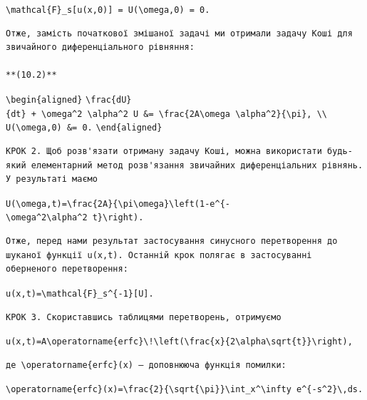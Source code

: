 \documentclass[
  ukrainian,
]{article}
\begin{document}
\texttt{\textbackslash{}mathcal\{F\}\_s{[}u(x,0){]}\ =\ U(\textbackslash{}omega,0)\ =\ 0.}

\begin{verbatim}
Отже, замість початкової змішаної задачі ми отримали задачу Коші для звичайного диференціального рівняння:

**(10.2)**
\end{verbatim}

\texttt{\textbackslash{}begin\{aligned\}}
\texttt{\textbackslash{}frac\{dU\}\{dt\}\ +\ \textbackslash{}omega\^{}2\ \textbackslash{}alpha\^{}2\ U\ \&=\ \textbackslash{}frac\{2A\textbackslash{}omega\ \textbackslash{}alpha\^{}2\}\{\textbackslash{}pi\},\ \textbackslash{}\textbackslash{}}
\texttt{U(\textbackslash{}omega,0)\ \&=\ 0.}
\texttt{\textbackslash{}end\{aligned\}}

\begin{verbatim}
КРОК 2. Щоб розв'язати отриману задачу Коші, можна використати будь-який елементарний метод розв'язання звичайних диференціальних рівнянь. У результаті маємо
\end{verbatim}

\texttt{U(\textbackslash{}omega,t)=\textbackslash{}frac\{2A\}\{\textbackslash{}pi\textbackslash{}omega\}\textbackslash{}left(1-e\^{}\{-\textbackslash{}omega\^{}2\textbackslash{}alpha\^{}2\ t\}\textbackslash{}right).}

\begin{verbatim}
Отже, перед нами результат застосування синусного перетворення до шуканої функції u(x,t). Останній крок полягає в застосуванні оберненого перетворення:
\end{verbatim}

\texttt{u(x,t)=\textbackslash{}mathcal\{F\}\_s\^{}\{-1\}{[}U{]}.}

\begin{verbatim}
КРОК 3. Скориставшись таблицями перетворень, отримуємо
\end{verbatim}

\texttt{u(x,t)=A\textbackslash{}operatorname\{erfc\}\textbackslash{}!\textbackslash{}left(\textbackslash{}frac\{x\}\{2\textbackslash{}alpha\textbackslash{}sqrt\{t\}\}\textbackslash{}right),}

\begin{verbatim}
де \operatorname{erfc}(x) — доповнююча функція помилки:
\end{verbatim}

\texttt{\textbackslash{}operatorname\{erfc\}(x)=\textbackslash{}frac\{2\}\{\textbackslash{}sqrt\{\textbackslash{}pi\}\}\textbackslash{}int\_x\^{}\textbackslash{}infty\ e\^{}\{-s\^{}2\}\textbackslash{},ds.}
\end{document}
